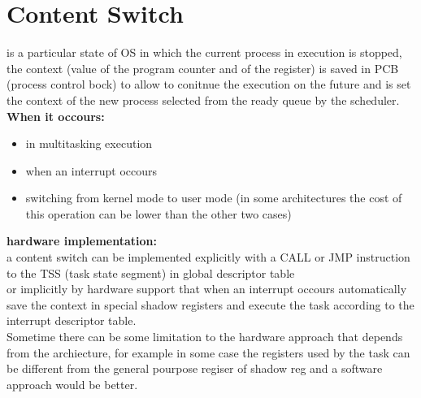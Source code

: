 \section{Content Switch}
is a particular state of OS in which the current process in execution is stopped, the context (value of the program counter and of the register) is saved in PCB (process control bock) to allow to conitnue the execution on the future and is set the context of the new process selected from the ready queue by the scheduler.\\
\textbf{When it occours:} \\
\begin{itemize}
		\item in multitasking execution
		\item when an interrupt occours
		\item switching from kernel mode to user mode (in some architectures the cost of this operation can be lower than the other two cases)
\end{itemize}
\textbf{hardware implementation:} \\
a content switch can be implemented explicitly with a CALL or JMP instruction to the TSS (task state segment) in global descriptor table\\
or implicitly by hardware support that when an interrupt occours automatically save the context in special shadow registers and execute the task according to the interrupt descriptor table.\\
Sometime there can be some limitation to the hardware approach that depends from the archiecture, for example in some case the registers used by the task can be different from the general pourpose regiser of shadow reg and a software approach would be better.







